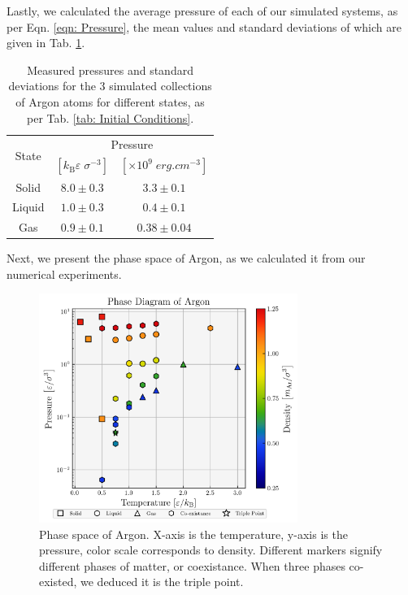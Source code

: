 \documentclass{IAYCPro}
\newcommand{\ssi}[1]{\;\si{#1}} %
\begin{document}
\raggedbottom
\newpage

Lastly, we calculated the average pressure of each of our simulated systems, as per Eqn. \ref{eqn: Pressure}, the mean values and standard deviations of which are given in Tab. \ref{tab: Pressures Results}. 

{\renewcommand{\arraystretch}{1.2}
\begin{table}[H]
    \centering
    \begin{tabular}{c||c|c}
         \multirow{2}{*}{State} & \multicolumn{2}{c}{Pressure} \\
         \cline{2-3}
         & $\left[k_\mathrm{B}\varepsilon\;\sigma^{-3} \right]$ & $\left[\times10^{9}\ssi{erg.cm^{-3}} \right]$\\
         \hline
         Solid & $8.0 \pm 0.3$ & $3.3 \pm 0.1$\\ %
         Liquid & $1.0 \pm 0.3$ & $0.4 \pm 0.1$ \\
         Gas & $0.9 \pm 0.1$ & $0.38 \pm 0.04$\\
    \end{tabular}
    \caption{Measured pressures and standard deviations for the 3 simulated collections of Argon atoms for different states, as per Tab. \ref{tab: Initial Conditions}.}
    \label{tab: Pressures Results}
\end{table}
}
Next, we present the phase space of Argon, as we calculated it from our numerical experiments.

\begin{figure}[H]
    \centering
    \includegraphics[width=0.75\textwidth]{figs/our_phase_space.png}
    \caption{Phase space of Argon. X-axis is the temperature, y-axis is the pressure, color scale corresponds to density. Different markers signify different phases of matter, or coexistance. When three phases co-existed, we deduced it is the triple point.}
    \label{fig: phasespace}
\end{figure}
\end{document}
